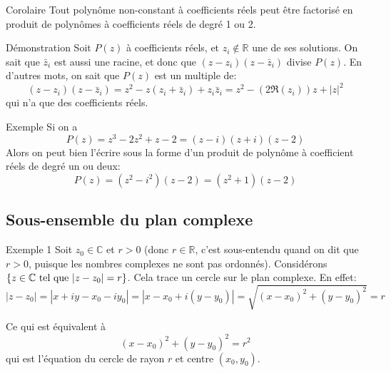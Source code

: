 \documentclass[a4paper]{article}
\begin{document}
\begin{parag}{Corolaire}
    Tout polynôme non-constant à coefficients réels peut être factorisé en produit de polynômes à coefficients réels de degré 1 ou 2.

    \begin{subparag}{Démonstration}
        Soit $P\left(z\right)$ à coefficients réels, et $z_i \not \in \mathbb{R}$ une de ses solutions. On sait que $\bar{z}_i$ est aussi une racine, et donc que $\left(z - z_i\right)\left(z - \bar{z}_i\right)$ divise $P(z)$. En d'autres mots, on sait que $P\left(z\right)$ est un multiple de:
        \[\left(z - z_i\right)\left(z - \bar{z}_i\right) = z^2 - z\left(z_i + \bar{z}_i\right) + z_i \bar{z}_i = z^2 - \left(2\Re\left(z_i\right)\right)z + \left|z\right|^2 \]
        qui n'a que des coefficients réels.
    \end{subparag}


    \begin{subparag}{Exemple}
        Si on a
        \[P\left(z\right) = z^3 - 2z^2 + z - 2 = \left(z-i\right)\left(z + i\right)\left(z- 2\right)\]
        Alors on peut bien l'écrire sous la forme d'un produit de polynôme à coefficient réels de degré un ou deux:
        \[P\left(z\right) = \left(z^2 - i^2\right)\left(z - 2\right) = \left(z^2 + 1\right)\left(z - 2\right)\]

    \end{subparag}

\end{parag}

\subsection{Sous-ensemble du plan complexe}
\begin{parag}{Exemple 1}
    Soit $z_0 \in \mathbb{C}$ et $r > 0$ (donc $r \in \mathbb{R}$, c'est sous-entendu quand on dit que $r > 0$, puisque les nombres complexes ne sont pas ordonnés). Considérons $\left\{z \in \mathbb{C} \telque \left|z - z_0\right| = r\right\}$. Cela trace un cercle sur le plan complexe. En effet:
    \[\left|z - z_0\right| = \left|x + iy - x_0 - iy_0\right| = \left|x - x_0 + i\left(y - y_0\right)\right| = \sqrt{\left(x - x_0\right)^2 + \left(y - y_0\right)^2} = r\]

    Ce qui est équivalent à
    \[\left(x - x_0\right)^2 + \left(y - y_0\right)^2 = r^2\]
    qui est l'équation du cercle de rayon $r$ et centre $\left(x_0, y_0\right)$.

\end{parag}
\end{document}
